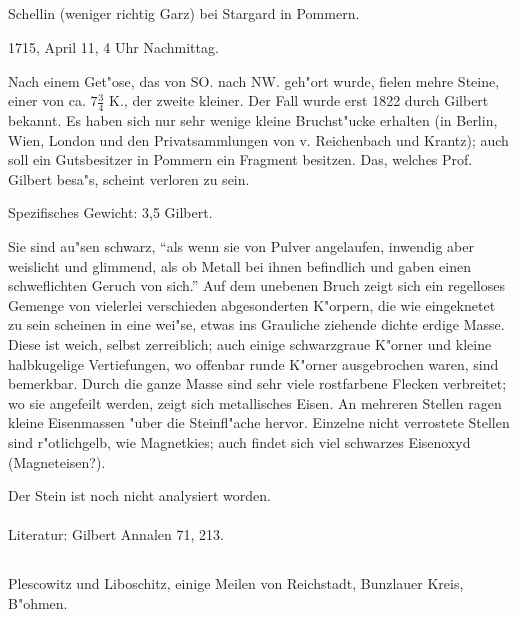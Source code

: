 \documentclass[a4paper, 11pt, oneside]{article}
\begin{document}
\subsection{}
\LARGE
\paragraph{}
Schellin (weniger richtig Garz) bei Stargard in Pommern.

1715, April 11, 4 Uhr Nachmittag.

Nach einem Get"ose, das von SO. nach NW. geh"ort wurde, fielen mehre Steine, einer von ca. $\mathfrak{7\frac{3}{4}}$ K., der zweite kleiner. Der Fall wurde erst 1822 durch Gilbert bekannt. Es haben sich nur sehr wenige kleine Bruchst"ucke erhalten (in Berlin, Wien, London und den Privatsammlungen von v. Reichenbach und Krantz); auch soll ein Gutsbesitzer in Pommern ein Fragment besitzen. Das, welches Prof. Gilbert besa"s, scheint verloren zu sein.

Spezifisches Gewicht: 3,5 Gilbert.

Sie sind au"sen schwarz, "`als wenn sie von Pulver angelaufen, inwendig aber weislicht und glimmend, als ob Metall bei ihnen befindlich und gaben einen schweflichten Geruch von sich."' Auf dem unebenen Bruch zeigt sich ein regelloses Gemenge von vielerlei verschieden abgesonderten K"orpern, die wie eingeknetet zu sein scheinen in eine wei"se, etwas ins Grauliche ziehende dichte erdige Masse. Diese ist weich, selbst zerreiblich; auch einige schwarzgraue K"orner und kleine halbkugelige Vertiefungen, wo offenbar runde K"orner ausgebrochen waren, sind bemerkbar. Durch die ganze Masse sind sehr viele rostfarbene Flecken verbreitet; wo sie angefeilt werden, zeigt sich metallisches Eisen. An mehreren Stellen ragen kleine Eisenmassen "uber die Steinfl"ache hervor. Einzelne nicht verrostete Stellen sind r"otlichgelb, wie Magnetkies; auch findet sich viel schwarzes Eisenoxyd (Magneteisen?).

Der Stein ist noch nicht analysiert worden.
\normalsize
\paragraph{}
Literatur: Gilbert Annalen 71, 213.
\subsection{}
\LARGE
\paragraph{}
Plescowitz und Liboschitz, einige Meilen von Reichstadt, Bunzlauer Kreis, B"ohmen.
\end{document}
